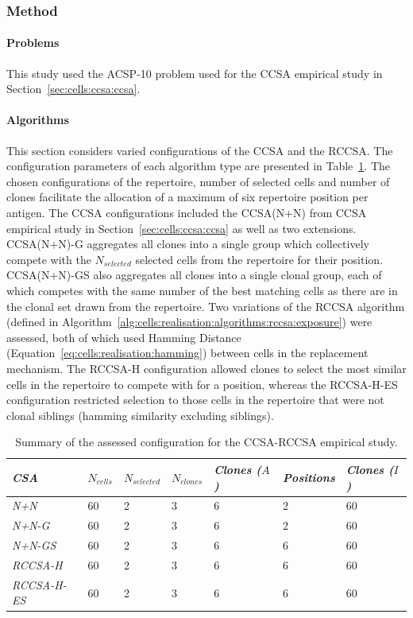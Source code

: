 %
%
\subsubsection{Method}

%
%
\paragraph{Problems}
This study used the ACSP-10 problem used for the CCSA empirical study in Section~\ref{sec:cells:ccsa:ccsa}.

% 
%
\paragraph{Algorithms}
This section considers varied configurations of the CCSA and the RCCSA. The configuration parameters of each algorithm type are presented in Table~\ref{tab:cells:clonalselection:rccsa}. The chosen configurations of the repertoire, number of selected cells and number of clones facilitate the allocation of a maximum of six repertoire position per antigen.
The CCSA configurations included the CCSA(N+N) from CCSA empirical study in Section~\ref{sec:cells:ccsa:ccsa} as well as two extensions. CCSA(N+N)-G aggregates all clones into a single group which collectively compete with the $N_{selected}$ selected cells from the repertoire for their position. CCSA(N+N)-GS also aggregates all clones into a single clonal group, each of which competes with the same number of the best matching cells as there are in the clonal set drawn from the repertoire.
Two variations of the RCCSA algorithm (defined in Algorithm~\ref{alg:cells:realisation:algorithms:rccsa:exposure}) were assessed, both of which used Hamming Distance (Equation~\ref{eq:cells:realisation:hamming}) between cells in the replacement mechanism. The RCCSA-H configuration allowed clones to select the most similar cells in the repertoire to compete with for a position, whereas the RCCSA-H-ES configuration restricted selection to those cells in the repertoire that were not clonal siblings (hamming similarity excluding siblings). 

\begin{table}[htp]
	\centering\small
		\begin{tabular}{lllllll}
		\toprule
		\emph{CSA} & $N_{cells}$ & $N_{selected}$ & $N_{clones}$ & \emph{Clones ($A$)} & \emph{Positions} & \emph{Clones ($I$)} \\ 
		\toprule
		\emph{N+N} & 60 & 2 & 3 & 6 & 2 & 60 \\ 
		\emph{N+N-G} & 60 & 2 & 3 & 6 & 2 & 60 \\ 
		\emph{N+N-GS} & 60 & 2 & 3 & 6 & 6 & 60 \\ 
		\emph{RCCSA-H} & 60 & 2 & 3 & 6 & 6 & 60 \\ 
		\emph{RCCSA-H-ES} & 60 & 2 & 3 & 6 & 6 & 60 \\ 
		\bottomrule
		\end{tabular}
	\caption{Summary of the assessed configuration for the CCSA-RCCSA empirical study.}
	\label{tab:cells:clonalselection:rccsa}
\end{table}



